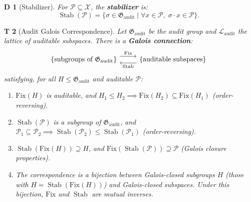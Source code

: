 \documentclass[12pt,a4paper]{article}
\newtheorem{theorem}Theorem[section]
\newtheorem{definition}[theorem]Definition
\theoremstyle{remark}
\newcommand{\Fix}{\mathrm{Fix}}
\newcommand{\AuditGrp}{\mathfrak{G}_{\mathrm{audit}}}
\newcommand{\ClaimSpace}{\mathcal{X}}
\DeclareMathOperator{\Stab}{Stab}
\begin{document}
\begin{definition}[Stabilizer]
For \(\mathcal{P} \subseteq \ClaimSpace\), the \textbf{stabilizer} is:
\begin{equation}
    \Stab(\mathcal{P}) = \{\sigma \in \AuditGrp \mid \forall x \in \mathcal{P},\; \sigma \cdot x \in \mathcal{P}\}.
\end{equation}
\end{definition}

\begin{theorem}[Audit Galois Correspondence]\label{thm:galois_correspondence}
Let \(\AuditGrp\) be the audit group and \(\mathcal{L}_{\mathrm{audit}}\) the lattice of auditable subspaces. There is a \textbf{Galois connection}:
\begin{equation}\label{eq:galois_correspondence}
    \begin{tikzcd}
        \{\text{subgroups of }\AuditGrp\} \ar[r, shift left=2, "\Fix"] &
        \{\text{auditable subspaces}\} \ar[l, shift left=2, "\Stab"]
    \end{tikzcd}
\end{equation}
satisfying, for all \(H \leq \AuditGrp\) and auditable \(\mathcal{P}\):
\begin{enumerate}[label=(\roman*),itemsep=3pt]
    \item \(\Fix(H)\) is auditable, and \(H_1 \leq H_2 \implies \Fix(H_2) \subseteq \Fix(H_1)\) (order-reversing).
    \item \(\Stab(\mathcal{P})\) is a subgroup of \(\AuditGrp\), and \(\mathcal{P}_1 \subseteq \mathcal{P}_2 \implies \Stab(\mathcal{P}_2) \leq \Stab(\mathcal{P}_1)\) (order-reversing).
    \item \(\Stab(\Fix(H)) \supseteq H\), and \(\Fix(\Stab(\mathcal{P})) \supseteq \mathcal{P}\) (Galois closure properties).
    \item The correspondence is a bijection between Galois-closed subgroups \(H\) (those with \(H = \Stab(\Fix(H))\)) and Galois-closed subspaces. Under this bijection, \(\Fix\) and \(\Stab\) are mutual inverses.
\end{enumerate}
\end{theorem}
\end{document}

